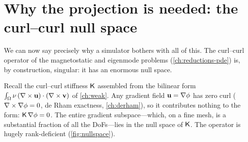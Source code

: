 \section{Why the projection is needed: the curl--curl null space}
\label{sec:nullspace}

We can now say precisely why a simulator bothers with all of this. The curl--curl
operator of the magnetostatic and eigenmode problems (\cref{ch:reductions-pde})
is, by construction, singular: it has an enormous null space.

Recall the curl--curl stiffness $\mathsf{K}$ assembled from the bilinear form
$\int_\Omega \nu\,(\nabla\times\mathbf{u})\cdot(\nabla\times\mathbf{v})$ of \cref{ch:weak}. Any gradient field
$\mathbf{u}=\nabla\phi$ has zero curl ($\nabla\times\nabla\phi=0$, de Rham exactness,
\cref{ch:derham}), so it contributes nothing to the form: $\mathsf{K}\,\nabla\phi=0$.
The entire gradient subspace---which, on a fine mesh, is a substantial fraction of
all the DoFs---lies in the null space of $\mathsf{K}$. The operator is hugely
rank-deficient (\cref{fig:nullspace}).

